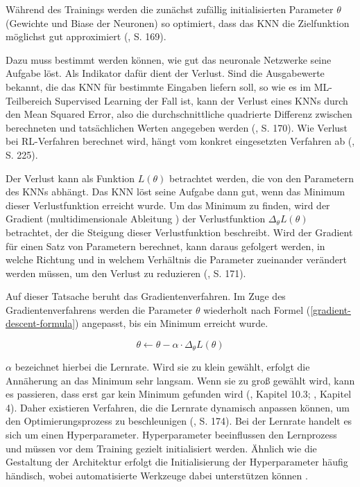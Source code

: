 Während des Trainings werden die zunächst zufällig initialisierten Parameter $\theta$ (Gewichte und Biase der Neuronen) so optimiert, dass das KNN die Zielfunktion möglichst gut approximiert (\cite{Albrecht.2024}, S. 169).

Dazu muss bestimmt werden können, wie gut das neuronale Netzwerke seine Aufgabe löst. Als Indikator dafür dient der Verlust. Sind die Ausgabewerte bekannt, die das KNN für bestimmte Eingaben liefern soll, so wie es im ML-Teilbereich Supervised Learning der Fall ist, kann der Verlust eines KNNs durch den Mean Squared Error, also die durchschnittliche quadrierte Differenz zwischen berechneten und tatsächlichen Werten angegeben werden (\cite{Albrecht.2024}, S. 170). Wie Verlust bei RL-Verfahren berechnet wird, hängt vom konkret eingesetzten Verfahren ab (\cite{Sutton.2018}, S. 225).

Der Verlust kann als Funktion $L(\theta)$ betrachtet werden, die von den Parametern des KNNs abhängt. Das KNN löst seine Aufgabe dann gut, wenn das Minimum dieser Verlustfunktion erreicht wurde. Um das Minimum zu finden, wird der Gradient (\glqq multidimensionale Ableitung \grqq{}) der Verlustfunktion $\Delta_\theta L(\theta)$ betrachtet, der die Steigung dieser Verlustfunktion beschreibt. Wird der Gradient für einen Satz von Parametern berechnet, kann daraus gefolgert werden, in welche Richtung und in welchem Verhältnis die Parameter zueinander verändert werden müssen, um den Verlust zu reduzieren (\cite{Albrecht.2024}, S. 171).

Auf dieser Tatsache beruht das Gradientenverfahren. Im Zuge des Gradientenverfahrens werden die Parameter $\theta$ wiederholt nach Formel (\ref{gradient-descent-formula}) angepasst, bis ein Minimum erreicht wurde.

\begin{equation}\label{gradient-descent-formula}
	\theta \leftarrow \theta {-} \alpha \cdot \Delta_\theta L(\theta)
\end{equation}

$\alpha$ bezeichnet hierbei die Lernrate. Wird sie zu klein gewählt, erfolgt die Annäherung an das Minimum sehr langsam. Wenn sie zu groß gewählt wird, kann es passieren, dass erst gar kein Minimum gefunden wird (\cite{Ferguson.January2019}, Kapitel 10.3; \cite{Buduma.2022}, Kapitel 4). Daher existieren Verfahren, die die Lernrate dynamisch anpassen können, um den Optimierungsprozess zu beschleunigen (\cite{Albrecht.2024}, S. 174). Bei der Lernrate handelt es sich um einen Hyperparameter. Hyperparameter beeinflussen den Lernprozess und müssen vor dem Training gezielt initialisiert werden. Ähnlich wie die Gestaltung der Architektur erfolgt die Initialisierung der Hyperparameter häufig händisch, wobei automatisierte Werkzeuge dabei unterstützen können \cite{Feurer.2019} \cite{Shawki.2021}.

